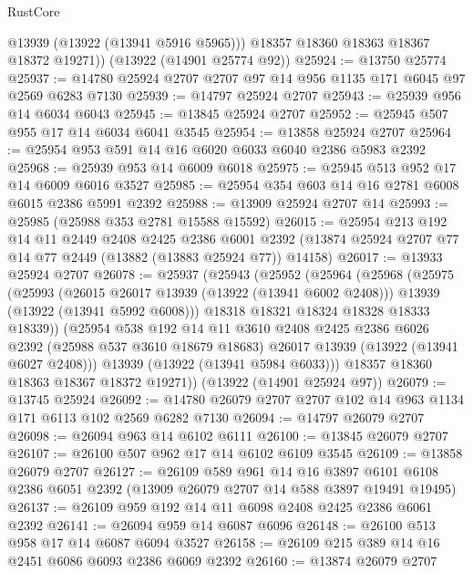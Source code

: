 \begin{lexlean}{RustCore}
\begin{coremodule}
          @13939
          (@13922 (@13941 @5916 @5965)))
        @18357
        @18360
        @18363
        @18367
        @18372
        @19271))
    (@13922 (@14901 @25774 @92))
@25924 := @13750 @25774
@25937 := @14780 @25924 @2707 @2707 @97 @14 @956 @1135 @171 @6045 @97 @2569 @6283 @7130
@25939 := @14797 @25924 @2707
@25943 := @25939 @956 @14 @6034 @6043
@25945 := @13845 @25924 @2707
@25952 := @25945 @507 @955 @17 @14 @6034 @6041 @3545
@25954 := @13858 @25924 @2707
@25964 := @25954 @953 @591 @14 @16 @6020 @6033 @6040 @2386 @5983 @2392
@25968 := @25939 @953 @14 @6009 @6018
@25975 := @25945 @513 @952 @17 @14 @6009 @6016 @3527
@25985 := @25954 @354 @603 @14 @16 @2781 @6008 @6015 @2386 @5991 @2392
@25988 := @13909 @25924 @2707 @14
@25993 := @25985 (@25988 @353 @2781 @15588 @15592)
@26015 := @25954
    @213
    @192
    @14
    @11
    @2449
    @2408
    @2425
    @2386
    @6001
    @2392
    (@13874 @25924 @2707 @77 @14 @77 @2449 (@13882 (@13883 @25924 @77)) @14158)
@26017 := @13933 @25924 @2707
@26078 := @25937
    (@25943
      (@25952
        (@25964
          (@25968
            (@25975
              (@25993
                (@26015 @26017 @13939 (@13922 (@13941 @6002 @2408)))
                @13939
                (@13922 (@13941 @5992 @6008)))
              @18318
              @18321
              @18324
              @18328
              @18333
              @18339))
          (@25954
            @538
            @192
            @14
            @11
            @3610
            @2408
            @2425
            @2386
            @6026
            @2392
            (@25988 @537 @3610 @18679 @18683)
            @26017
            @13939
            (@13922 (@13941 @6027 @2408)))
          @13939
          (@13922 (@13941 @5984 @6033)))
        @18357
        @18360
        @18363
        @18367
        @18372
        @19271))
    (@13922 (@14901 @25924 @97))
@26079 := @13745 @25924
@26092 := @14780 @26079 @2707 @2707 @102 @14 @963 @1134 @171 @6113 @102 @2569 @6282 @7130
@26094 := @14797 @26079 @2707
@26098 := @26094 @963 @14 @6102 @6111
@26100 := @13845 @26079 @2707
@26107 := @26100 @507 @962 @17 @14 @6102 @6109 @3545
@26109 := @13858 @26079 @2707
@26127 := @26109
    @589
    @961
    @14
    @16
    @3897
    @6101
    @6108
    @2386
    @6051
    @2392
    (@13909 @26079 @2707 @14 @588 @3897 @19491 @19495)
@26137 := @26109 @959 @192 @14 @11 @6098 @2408 @2425 @2386 @6061 @2392
@26141 := @26094 @959 @14 @6087 @6096
@26148 := @26100 @513 @958 @17 @14 @6087 @6094 @3527
@26158 := @26109 @215 @389 @14 @16 @2451 @6086 @6093 @2386 @6069 @2392
@26160 := @13874 @26079 @2707

\end{coremodule}
\end{lexlean}
